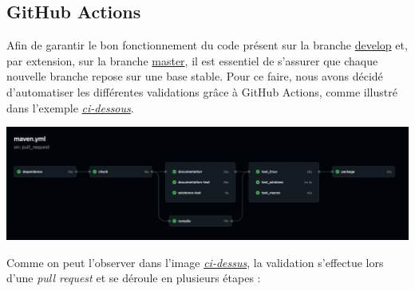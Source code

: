 \subsection{GitHub Actions}

Afin de garantir le bon fonctionnement du code présent sur la branche \href{https://github.com/Gr4-M3ACNL/hashi/tree/dev}{develop} et, par extension, sur la branche \href{https://github.com/Gr4-M3ACNL/hashi/tree/master}{master}, il est essentiel de s'assurer que chaque nouvelle branche repose sur une base stable. Pour ce faire, nous avons décidé d'automatiser les différentes validations grâce à GitHub Actions, comme illustré dans l'exemple \hyperlink{imgActionCheck}{\emph{ci-dessous}}.

\begin{center}
    \hypertarget{imgActionCheck}{
         \includegraphics[width=15cm]{../Annexe/git_action_check.png}
    }
\end{center}

Comme on peut l'observer dans l'image \hyperlink{imgActionCheck}{\emph{ci-dessus}}, la validation s'effectue lors d'une \emph{pull request} et se déroule en plusieurs étapes :

